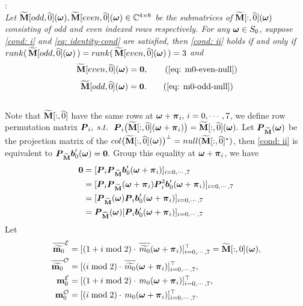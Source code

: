 :\\[.2em]
{\it Let $\widetilde{\mathbf{M}}[odd,\widehat{0}](\boldsymbol{\omega}),\widetilde{\mathbf{M}}[even,\widehat{0}](\boldsymbol{\omega})\in\mathbb{C}^{4\times6}$ be the submatrices of $\widetilde{\mathbf{M}}[:,\widehat{0}](\boldsymbol{\omega})$ consisting of odd and even indexed rows respectively. For any $\boldsymbol{\omega}\in S_0$, suppose {\rm\ref{cond: i}} and \eqref{eq: identity-cond} are satisfied, then {\rm\ref{cond: ii}} holds if and only if $rank(\,\widetilde{\mathbf{M}}[odd,\widehat{0}](\boldsymbol{\omega})\,) = rank(\,\widetilde{\mathbf{M}}[even,\widehat{0}](\boldsymbol{\omega})\,) = 3$ and 
\begin{align}%
[m_0(\V{\omega}),m_0(\V{\omega}+\V{\pi}_2), m_0(\V{\omega} +\V{\pi}_4), m_0(\V{\omega}+\V{\pi}_6)]\, \M[even,\widehat{0}](\V{\omega}) = \V{0}, \tag{\ref{eq: m0-even-null}}
\end{align}
\begin{align}%
[m_0(\V{\omega}+\V{\pi}_1),m_0(\V{\omega}+\V{\pi}_3), m_0(\V{\omega} +\V{\pi}_5), m_0(\V{\omega}+\V{\pi}_7)] \,\M[odd,\widehat{0}](\V{\omega}) = \V{0}. \tag{\ref{eq: m0-odd-null}}
\end{align}
}
\\[.5em]
Note that $\widetilde{\mathbf{M}}[:,\widehat{0}]$ have the same rows at $\boldsymbol{\omega} + \boldsymbol{\pi}_i,\,i = 0,\cdots,7$, we define row permutation matrix $\boldsymbol{P}_i,\; s.t.\,$ $\boldsymbol{P}_i\big(\widetilde{\mathbf{M}}[:,\widehat{0}](\boldsymbol{\omega} + \boldsymbol{\pi}_i)\big) = \widetilde{\mathbf{M}}[:,\widehat{0}](\boldsymbol{\omega}). $ Let $\boldsymbol{P}_{\widetilde{\mathbf{M}}}(\boldsymbol{\omega})$ be the projection matrix of the $col\big(\widetilde{\mathbf{M}}[:,\widehat{0}](\boldsymbol{\omega})\big)^\bot = null(\widetilde{\mathbf{M}}[:,\widehat{0}]^*)$, then \ref{cond: ii} is equivalent to $\boldsymbol{P}_{\widetilde{\mathbf{M}}}\boldsymbol{b}_0'(\boldsymbol{\omega}) = \boldsymbol{0}.$ Group this equality at $\boldsymbol{\omega}+\boldsymbol{\pi}_i$, we have 
\begin{align}\label{eq: group-proj}
\boldsymbol{0} & = [\boldsymbol{P}_i\boldsymbol{P}_{\widetilde{\mathbf{M}}}\boldsymbol{b}_0'(\boldsymbol{\omega} + \boldsymbol{\pi}_i) ]_{i=0,\cdots,7}\notag\\
&= [\boldsymbol{P}_i\boldsymbol{P}_{\widetilde{\mathbf{M}}}(\boldsymbol{\omega}+\boldsymbol{\pi}_i)\boldsymbol{P}_i^2\boldsymbol{b}_0'(\boldsymbol{\omega}+\boldsymbol{\pi}_i) ]_{i = 0,\cdots,7}\notag\\
&= [\boldsymbol{P}_{\widetilde{\mathbf{M}}}(\boldsymbol{\omega})\boldsymbol{P}_i\boldsymbol{b}_0'(\boldsymbol{\omega}+\boldsymbol{\pi}_i)]_{i = 0,\cdots,7}\notag\\
&= \boldsymbol{P}_{\widetilde{\mathbf{M}}}(\boldsymbol{\omega})[\boldsymbol{P}_i\boldsymbol{b}_0'(\boldsymbol{\omega}+\boldsymbol{\pi}_i)]_{i = 0,\cdots,7}
\end{align}
Let 
\begin{align*}
\mteven&= [ (1 + i \bmod 2)\cdot\,\sbarmp{0}{i}]_{i=0,\cdots,7}^\top = \M[:,0](\V{\omega}),\\
\mtodd&= [ (i \bmod 2)\cdot\,\sbarmp{0}{i}]_{i=0,\cdots,7}^\top,\\
\meven&= [ (1 + i \bmod 2)\cdot\,m_0(\V{\omega} + \V{\pi}_i)]_{i=0,\cdots,7}^\top,\\
\modd&= [ ( i \bmod 2)\cdot\,m_0(\V{\omega} + \V{\pi}_i)]_{i=0,\cdots,7}^\top.
\end{align*}
